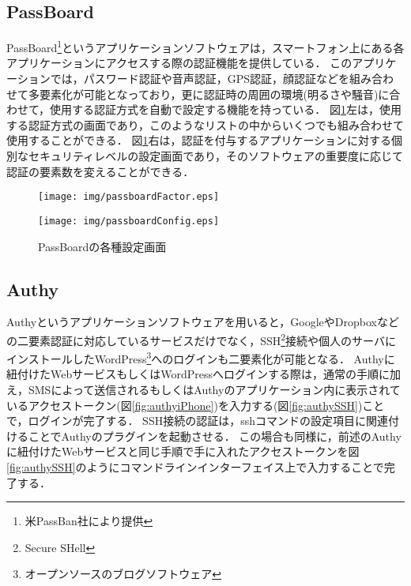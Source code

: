 \subsection{PassBoard}\label{subsec:passboard}
PassBoard\footnote{米PassBan社により提供}というアプリケーションソフトウェア\cite{passboard}は，スマートフォン上にある各アプリケーションにアクセスする際の認証機能を提供している．
このアプリケーションでは，パスワード認証や音声認証，GPS認証，顔認証などを組み合わせて多要素化が可能となっており，更に認証時の周囲の環境(明るさや騒音)に合わせて，使用する認証方式を自動で設定する機能を持っている．
図\ref{fig:passboard}左は，使用する認証方式の画面であり，このようなリストの中からいくつでも組み合わせて使用することができる．
図\ref{fig:passboard}右は，認証を付与するアプリケーションに対する個別なセキュリティレベルの設定画面であり，そのソフトウェアの重要度に応じて認証の要素数を変えることができる．

\begin{figure}[ht]
  \begin{minipage}{0.5\hsize}
    \begin{center}
      \texttt{[image: img/passboardFactor.eps]}
    \end{center}
  \end{minipage}
  \begin{minipage}{0.5\hsize}
    \begin{center}
      \texttt{[image: img/passboardConfig.eps]}
    \end{center}
  \end{minipage}
  \caption{PassBoardの各種設定画面}
  \label{fig:passboard}
\end{figure}

\subsection{Authy}
Authy\cite{authy}というアプリケーションソフトウェアを用いると，GoogleやDropboxなどの二要素認証に対応しているサービスだけでなく，SSH\footnote{Secure SHell}接続や個人のサーバにインストールしたWordPress\footnote{オープンソースのブログソフトウェア}へのログインも二要素化が可能となる．
Authyに紐付けたWebサービスもしくはWordPressへログインする際は，通常の手順に加え，SMSによって送信されるもしくはAuthyのアプリケーション内に表示されているアクセストークン(図\ref{fig:authyiPhone})を入力する(図\ref{fig:authySSH})ことで，ログインが完了する．
SSH接続の認証は，sshコマンドの設定項目に関連付けることでAuthyのプラグインを起動させる．
この場合も同様に，前述のAuthyに紐付けたWebサービスと同じ手順で手に入れたアクセストークンを図\ref{fig:authySSH}のようにコマンドラインインターフェイス上で入力することで完了する．

